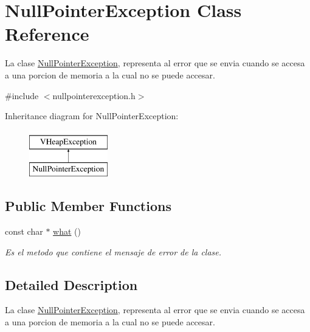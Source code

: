 \hypertarget{class_null_pointer_exception}{\section{Null\-Pointer\-Exception Class Reference}
\label{class_null_pointer_exception}
}


La clase \hyperlink{class_null_pointer_exception}{Null\-Pointer\-Exception}, representa al error que se envia cuando se accesa a una porcion de memoria a la cual no se puede accesar.  




{\ttfamily \#include $<$nullpointerexception.\-h$>$}

Inheritance diagram for Null\-Pointer\-Exception\-:\begin{figure}[H]
\begin{center}
\leavevmode
\includegraphics[height=2.000000cm]{class_null_pointer_exception}
\end{center}
\end{figure}
\subsection*{Public Member Functions}
\begin{DoxyCompactItemize}
\item 
const char $\ast$ \hyperlink{class_null_pointer_exception_a0dcc55bb0f3a50e888d8d4a904508313}{what} ()
\begin{DoxyCompactList}\small\item\em Es el metodo que contiene el mensaje de error de la clase. \end{DoxyCompactList}\end{DoxyCompactItemize}


\subsection{Detailed Description}
La clase \hyperlink{class_null_pointer_exception}{Null\-Pointer\-Exception}, representa al error que se envia cuando se accesa a una porcion de memoria a la cual no se puede accesar. 

